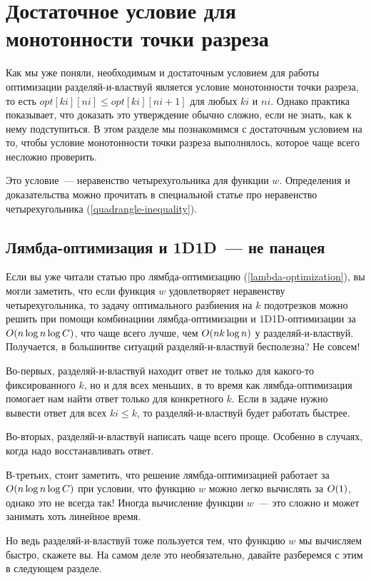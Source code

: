 \section{Достаточное условие для монотонности точки разреза}

Как мы уже поняли, необходимым и достаточным условием для работы оптимизации разделяй-и-властвуй является условие монотонности точки разреза, то есть $opt[ki][ni] \le opt[ki][ni + 1]$ для любых $ki$ и $ni$. Однако практика показывает, что доказать это утверждение обычно сложно, если не знать, как к нему подступиться. В этом разделе мы познакомимся с достаточным условием на то, чтобы условие монотонности точки разреза выполнялось, которое чаще всего несложно проверить.

Это условие~--- неравенство четырехугольника для функции $w$. Определения и доказательства можно прочитать в специальной статье про неравенство четырехугольника (\ref{quadrangle-inequality}).

\subsection{Лямбда-оптимизация и 1D1D~--- не панацея}

Если вы уже читали статью про лямбда-оптимизацию (\ref{lambda-optimization}), вы могли заметить, что если функция $w$ удовлетворяет неравенству четырехугольника, то задачу оптимального разбиения на $k$ подотрезков можно решить при помощи комбинациии лямбда-оптимизации и 1D1D-оптимизации за $O(n \log n \log C)$, что чаще всего лучше, чем $O(n k \log n)$ у разделяй-и-властвуй. Получается, в большинтве ситуаций разделяй-и-властвуй бесполезна? Не совсем!

Во-первых, разделяй-и-властвуй находит ответ не только для какого-то фиксированного $k$, но и для всех меньших, в то время как лямбда-оптимизация помогает нам найти ответ только для конкретного $k$. Если в задаче нужно вывести ответ для всех $ki \le k$, то разделяй-и-властвуй будет работать быстрее.

Во-вторых, разделяй-и-властвуй написать чаще всего проще. Особенно в случаях, когда надо восстанавливать ответ.

В-третьих, стоит заметить, что решение лямбда-оптимизацией работает за $O(n \log n \log C)$ при условии, что функцию $w$ можно легко вычислять за $O(1)$, однако это не всегда так! Иногда вычисление функции $w$~--- это сложно и может занимать хоть линейное время.

Но ведь разделяй-и-властвуй тоже пользуется тем, что функцию $w$ мы вычисляем быстро, скажете вы. На самом деле это необязательно, давайте разберемся с этим в следующем разделе.


